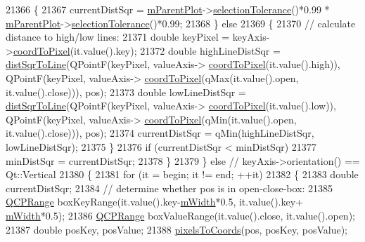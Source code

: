 \begin{DoxyCode}
21366       \{
21367         currentDistSqr = \hyperlink{class_q_c_p_layerable_aa2a528433e44db02b8aef23c1f9f90ed}{mParentPlot}->\hyperlink{class_q_custom_plot_a7b738074c75e80070ef6a10263c6cd69}{selectionTolerance}()*0.99 * 
      \hyperlink{class_q_c_p_layerable_aa2a528433e44db02b8aef23c1f9f90ed}{mParentPlot}->\hyperlink{class_q_custom_plot_a7b738074c75e80070ef6a10263c6cd69}{selectionTolerance}()*0.99;
21368       \} \textcolor{keywordflow}{else}
21369       \{
21370         \textcolor{comment}{// calculate distance to high/low lines:}
21371         \textcolor{keywordtype}{double} keyPixel = keyAxis->\hyperlink{class_q_c_p_axis_a985ae693b842fb0422b4390fe36d299a}{coordToPixel}(it.value().key);
21372         \textcolor{keywordtype}{double} highLineDistSqr = \hyperlink{class_q_c_p_abstract_plottable_a5ea1cab44ca912dcdc96ed81ec5bed5d}{distSqrToLine}(QPointF(keyPixel, valueAxis->
      \hyperlink{class_q_c_p_axis_a985ae693b842fb0422b4390fe36d299a}{coordToPixel}(it.value().high)), QPointF(keyPixel, valueAxis->
      \hyperlink{class_q_c_p_axis_a985ae693b842fb0422b4390fe36d299a}{coordToPixel}(qMax(it.value().open, it.value().close))), pos);
21373         \textcolor{keywordtype}{double} lowLineDistSqr = \hyperlink{class_q_c_p_abstract_plottable_a5ea1cab44ca912dcdc96ed81ec5bed5d}{distSqrToLine}(QPointF(keyPixel, valueAxis->
      \hyperlink{class_q_c_p_axis_a985ae693b842fb0422b4390fe36d299a}{coordToPixel}(it.value().low)), QPointF(keyPixel, valueAxis->
      \hyperlink{class_q_c_p_axis_a985ae693b842fb0422b4390fe36d299a}{coordToPixel}(qMin(it.value().open, it.value().close))), pos);
21374         currentDistSqr = qMin(highLineDistSqr, lowLineDistSqr);
21375       \}
21376       \textcolor{keywordflow}{if} (currentDistSqr < minDistSqr)
21377         minDistSqr = currentDistSqr;
21378     \}
21379   \} \textcolor{keywordflow}{else} \textcolor{comment}{// keyAxis->orientation() == Qt::Vertical}
21380   \{
21381     \textcolor{keywordflow}{for} (it = begin; it != end; ++it)
21382     \{
21383       \textcolor{keywordtype}{double} currentDistSqr;
21384       \textcolor{comment}{// determine whether pos is in open-close-box:}
21385       \hyperlink{class_q_c_p_range}{QCPRange} boxKeyRange(it.value().key-\hyperlink{class_q_c_p_financial_af630e5eb8485146b9c777e63fd1cf993}{mWidth}*0.5, it.value().key+
      \hyperlink{class_q_c_p_financial_af630e5eb8485146b9c777e63fd1cf993}{mWidth}*0.5);
21386       \hyperlink{class_q_c_p_range}{QCPRange} boxValueRange(it.value().close, it.value().open);
21387       \textcolor{keywordtype}{double} posKey, posValue;
21388       \hyperlink{class_q_c_p_abstract_plottable_a10408828446e9e0681c46d65120f382e}{pixelsToCoords}(pos, posKey, posValue);

\end{DoxyCode}
